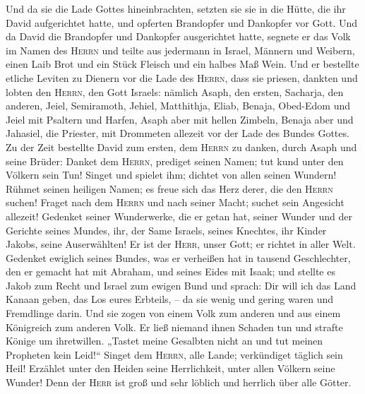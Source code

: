  Und da sie die Lade Gottes hineinbrachten, setzten sie
sie in die Hütte, die ihr David aufgerichtet hatte, und opferten
Brandopfer und Dankopfer vor Gott.  Und da David die
Brandopfer und Dankopfer ausgerichtet hatte, segnete er das Volk im
Namen des \textsc{Herrn}  und teilte aus jedermann in
Israel, Männern und Weibern, einen Laib Brot und ein Stück Fleisch und
ein halbes Maß Wein.  Und er bestellte etliche Leviten zu
Dienern vor die Lade des \textsc{Herrn}, dass sie priesen, dankten und
lobten den \textsc{Herrn}, den Gott Israels:  nämlich
Asaph, den ersten, Sacharja, den anderen, Jeiel, Semiramoth, Jehiel,
Matthithja, Eliab, Benaja, Obed-Edom und Jeiel mit Psaltern und Harfen,
Asaph aber mit hellen Zimbeln,  Benaja aber und Jahasiel,
die Priester, mit Drommeten allezeit vor der Lade des Bundes Gottes.
 Zu der Zeit bestellte David zum ersten, dem
\textsc{Herrn} zu danken, durch Asaph und seine Brüder: 
Danket dem \textsc{Herrn}, prediget seinen Namen; tut kund unter den
Völkern sein Tun!  Singet und spielet ihm; dichtet von
allen seinen Wundern!  Rühmet seinen heiligen Namen; es
freue sich das Herz derer, die den \textsc{Herrn} suchen!
 Fraget nach dem \textsc{Herrn} und nach seiner Macht;
suchet sein Angesicht allezeit!  Gedenket seiner
Wunderwerke, die er getan hat, seiner Wunder und der Gerichte seines
Mundes,  ihr, der Same Israels, seines Knechtes, ihr
Kinder Jakobs, seine Auserwählten!  Er ist der
\textsc{Herr}, unser Gott; er richtet in aller Welt. 
Gedenket ewiglich seines Bundes, was er verheißen hat in tausend
Geschlechter,  den er gemacht hat mit Abraham, und seines
Eides mit Isaak;  und stellte es Jakob zum Recht und
Israel zum ewigen Bund  und sprach: Dir will ich das Land
Kanaan geben, das Los eures Erbteils, --  da sie wenig
und gering waren und Fremdlinge darin.  Und sie zogen von
einem Volk zum anderen und aus einem Königreich zum anderen Volk.
 Er ließ niemand ihnen Schaden tun und strafte Könige um
ihretwillen.  „Tastet meine Gesalbten nicht an und tut
meinen Propheten kein Leid!{}``  Singet dem
\textsc{Herrn}, alle Lande; verkündiget täglich sein Heil!
 Erzählet unter den Heiden seine Herrlichkeit, unter
allen Völkern seine Wunder!  Denn der \textsc{Herr} ist
groß und sehr löblich und herrlich über alle Götter. 
